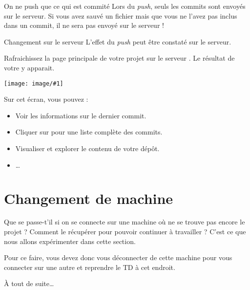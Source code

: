 \documentclass[a4paper,11pt]{style-esi/td}
\newcommand{\image}[2]{{\par\centering \texttt{[image: image/\#1]}\par}
}
\begin{document}
\begin{alertit}{On ne push que ce qui est commité}
	Lors du \emph{push}, 
	seuls les commits sont envoyés sur le serveur.
	Si vous avez sauvé un fichier 
	mais que vous ne l'avez pas inclus dans un commit,
	il ne sera pas envoyé sur le serveur !
\end{alertit}

\begin{Tutoriel}{Changement sur le serveur}
	L'effet du \emph{push} peut être constaté sur le serveur.
	\begin{steps}
	\item
		Rafraichissez la page principale de votre projet sur le serveur .
		Le résultat de votre  y apparait.
		\image{NetBeans_Push09}{4cm}
	\end{steps}
	Sur cet écran, vous pouvez :
	\begin{itemize}
	\item Voir les informations sur le dernier commit.
	\item Cliquer sur  pour une liste complète des commits.
	\item Visualiser et explorer le contenu de votre dépôt.
	\item \dots{}
	\end{itemize}
\end{Tutoriel}

\section{Changement de machine}

Que se passe-t'il si on se connecte sur une machine 
où ne se trouve pas encore le projet ?
Comment le récupérer pour pouvoir continuer à travailler ?
C'est ce que nous allons expérimenter dans cette section.

Pour ce faire, vous devez donc vous déconnecter de cette machine
pour vous connecter sur une autre et reprendre le TD à cet endroit.

À tout de suite\dots{}
\end{document}
